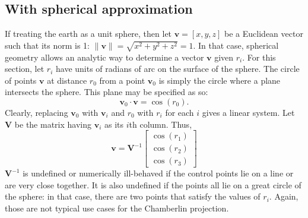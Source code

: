 \documentclass{amsart}[12pt]
\begin{document}
\subsection{With spherical approximation}
If treating the earth as a unit sphere, then let $\mathbf v = [x, y, z]$ be a
Euclidean vector such that its norm is 1:
$\|\mathbf v \|= \sqrt{x^2 + y^2 + z^2} = 1$.
In that case, spherical geometry allows an analytic way to determine a vector
$\mathbf v$ given $r_i$. For this section, let $r_i$ have units of radians of
arc on the surface of the sphere. The circle of points $\mathbf v$ at distance
$r_0$ from a point $\mathbf v_0$ is simply the circle where a plane intersects
the sphere. This plane may be specified as so:
\begin{equation}
  \mathbf v_0 \cdot \mathbf v = \cos\left(r_0\right).
\end{equation}
Clearly, replacing $\mathbf v_0$ with $\mathbf v_i$ and $r_0$ with $r_i$ for
each $i$ gives a linear system. Let $\mathbf V$ be the matrix having
$\mathbf v_i$ as its $i$th column. Thus,
\begin{equation}
  \mathbf v = \mathbf V^{-1} \begin{bmatrix} \cos\left(r_1\right) \\
  \cos\left(r_2\right) \\
  \cos\left(r_3\right)
  \end{bmatrix}
\end{equation}
$\mathbf V^{-1}$ is undefined or numerically ill-behaved if the control points
lie on a line or are very close together. It is also undefined if the points all
lie on a great circle of the sphere: in that case, there are two points that
satisfy the values of $r_i$. Again, those are not typical use cases for
the Chamberlin projection.
\end{document}
